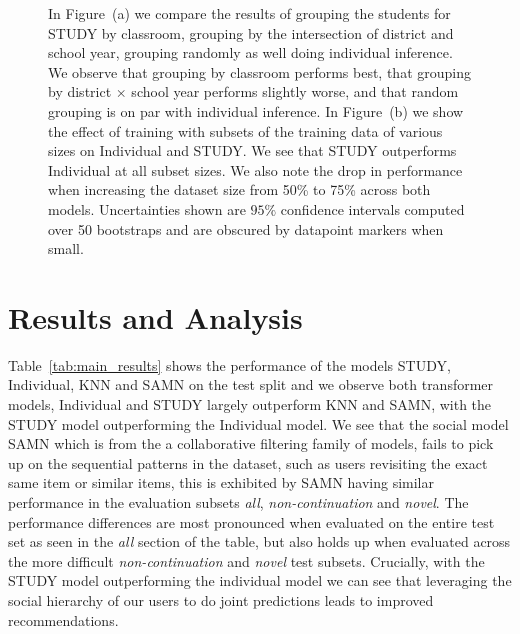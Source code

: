 \documentclass{article}
\begin{document}
\begin{figure}[]
\begin{subfigure}[t]{0.4\linewidth}
        \caption{}
        \label{fig:data_ablation}
    \end{subfigure}
        \caption{In Figure~(a) we compare the results of grouping the students for STUDY by classroom, grouping by the intersection of district and school year, grouping randomly as well doing individual inference. We observe that grouping by classroom performs best, that grouping by district $\times$ school year performs slightly worse, and that random grouping is on par with individual inference.
        In Figure~(b) we show the effect of training with subsets of the training data of various sizes on Individual and STUDY. We see that STUDY outperforms Individual at all subset sizes. We also note the drop in performance when increasing the dataset size from 50\% to 75\% across both models. Uncertainties shown are $95\%$ confidence intervals computed over 50 bootstraps and are obscured by datapoint markers when small.  }
\end{figure}

\section{Results and Analysis}
\label{section:results}
Table~\ref{tab:main_results} shows the performance of the models STUDY, Individual, KNN and SAMN on the test split and we observe both transformer models, Individual and STUDY largely outperform KNN and SAMN, with the STUDY model outperforming the Individual model. We see that the social model SAMN which is from the a collaborative filtering family of models, fails to pick up on the sequential patterns in the dataset, such as users revisiting the exact same item or similar items, this is exhibited by SAMN having similar performance in the evaluation subsets {\it all}, {\it non-continuation} and {\it novel}. The performance differences are most pronounced when evaluated on the entire test set as seen in the \textit{all} section of the table, but also holds up when evaluated across the more difficult \textit{non-continuation} and \textit{novel} test subsets. Crucially, with the STUDY model outperforming the individual model we can see that leveraging the social hierarchy of our users to do joint predictions leads to improved recommendations.
\end{document}
